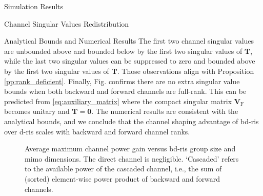 \documentclass[journal]{IEEEtran}
\begin{document}
\begin{section}{Simulation Results}
\begin{subsection}{Channel Singular Values Redistribution}
\begin{subsubsection}{Analytical Bounds and Numerical Results}
			The first two channel singular values are unbounded above and bounded below by the first two singular values of $\mathbf{T}$, while the last two singular values can be suppressed to zero and bounded above by the first two singular values of $\mathbf{T}$.
			Those observations align with Proposition \ref{pp:rank_deficient}.
			Finally, Fig.  confirms there are no extra singular value bounds when both backward and forward channels are full-rank.
			This can be predicted from \eqref{eq:auxiliary_matrix} where the compact singular matrix $\mathbf{V}_\mathrm{F}$ becomes unitary and $\mathbf{T}=\mathbf{0}$.
			The numerical results are consistent with the analytical bounds, and we conclude that the channel shaping advantage of \gls{bd}-\gls{ris} over \gls{d}-\gls{ris} scales with backward and forward channel ranks.


			\begin{figure}[!t]
				\centering
				\caption{
					Average maximum channel power gain versus \gls{bd}-\gls{ris} group size and \gls{mimo} dimensions.
					The direct channel is negligible.
					`Cascaded' refers to the available power of the cascaded channel, i.e., the sum of (sorted) element-wise power product of backward and forward channels.
				}
				\label{fg:power_bond}
			\end{figure}


\end{subsubsection}
\end{subsection}
\end{section}
\end{document}
